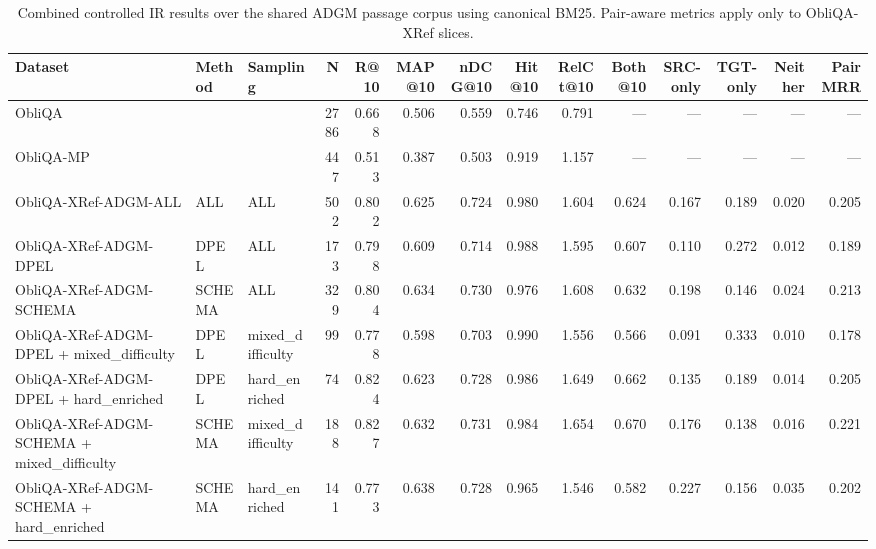\begin{table}[t]
\centering
\small
\begin{tabular}{lllrrrrrrrrrrr}
\toprule
Dataset & Method & Sampling & N & R@10 & MAP@10 & nDCG@10 & Hit@10 & RelCt@10 & Both@10 & SRC-only & TGT-only & Neither & PairMRR \\
\midrule
ObliQA &  &  & 2786 & 0.668 & 0.506 & 0.559 & 0.746 & 0.791 & — & — & — & — & — \\
ObliQA-MP &  &  & 447 & 0.513 & 0.387 & 0.503 & 0.919 & 1.157 & — & — & — & — & — \\
ObliQA-XRef-ADGM-ALL & ALL & ALL & 502 & 0.802 & 0.625 & 0.724 & 0.980 & 1.604 & 0.624 & 0.167 & 0.189 & 0.020 & 0.205 \\
ObliQA-XRef-ADGM-DPEL & DPEL & ALL & 173 & 0.798 & 0.609 & 0.714 & 0.988 & 1.595 & 0.607 & 0.110 & 0.272 & 0.012 & 0.189 \\
ObliQA-XRef-ADGM-SCHEMA & SCHEMA & ALL & 329 & 0.804 & 0.634 & 0.730 & 0.976 & 1.608 & 0.632 & 0.198 & 0.146 & 0.024 & 0.213 \\
ObliQA-XRef-ADGM-DPEL + mixed\_difficulty & DPEL & mixed\_difficulty & 99 & 0.778 & 0.598 & 0.703 & 0.990 & 1.556 & 0.566 & 0.091 & 0.333 & 0.010 & 0.178 \\
ObliQA-XRef-ADGM-DPEL + hard\_enriched & DPEL & hard\_enriched & 74 & 0.824 & 0.623 & 0.728 & 0.986 & 1.649 & 0.662 & 0.135 & 0.189 & 0.014 & 0.205 \\
ObliQA-XRef-ADGM-SCHEMA + mixed\_difficulty & SCHEMA & mixed\_difficulty & 188 & 0.827 & 0.632 & 0.731 & 0.984 & 1.654 & 0.670 & 0.176 & 0.138 & 0.016 & 0.221 \\
ObliQA-XRef-ADGM-SCHEMA + hard\_enriched & SCHEMA & hard\_enriched & 141 & 0.773 & 0.638 & 0.728 & 0.965 & 1.546 & 0.582 & 0.227 & 0.156 & 0.035 & 0.202 \\
\bottomrule
\end{tabular}
\caption{Combined controlled IR results over the shared ADGM passage corpus using canonical BM25. Pair-aware metrics apply only to ObliQA-XRef slices.}
\label{tab:combined-controlled-ir}
\end{table}
